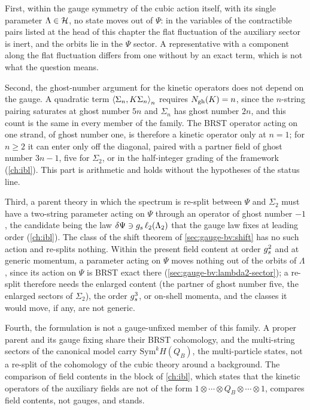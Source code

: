 First, within the gauge symmetry of the cubic action itself, with its single parameter $\Lambda \in \Hs$, no state moves out of $\Psi$: in the variables of the contractible pairs listed at the head of this chapter the flat fluctuation of the auxiliary sector is inert, and the orbits lie in the $\Psi$ sector.
A representative with a component along the flat fluctuation differs from one without by an exact term, which is not what the question means.

Second, the ghost-number argument for the kinetic operators does not depend on the gauge.
A quadratic term $\pair[n]{\Sigma_n}{K \Sigma_n}$ requires $\Ngh(K) = n$, since the $n$-string pairing saturates at ghost number $5 n$ and $\Sigma_n$ has ghost number $2 n$, and this count is the same in every member of the family.
The BRST operator acting on one strand, of ghost number one, is therefore a kinetic operator only at $n = 1$; for $n \ge 2$ it can enter only off the diagonal, paired with a partner field of ghost number $3 n - 1$, five for $\Sigma_2$, or in the half-integer grading of the \IBL{} framework (\cref{ch:ibl}).
This part is arithmetic and holds without the hypotheses of the status line.

Third, a parent theory in which the spectrum is re-split between $\Psi$ and $\Sigma_2$ must have a two-string parameter acting on $\Psi$ through an operator of ghost number $-1$, the candidate being the law $\delta \Psi \ni \gs \, \ell_2(\Lambda_2)$ that the \IBL{} gauge law fixes at leading order (\cref{ch:ibl}).
The class of the shift theorem of \cref{sec:gauge-bv:shift} has no such action and re-splits nothing.
Within the present field content at order $\gs^2$ and at generic momentum, a parameter acting on $\Psi$ moves nothing out of the orbits of $\Lambda$, since its action on $\Psi$ is BRST exact there (\cref{sec:gauge-bv:lambda2-sector}); a re-split therefore needs the enlarged content (the partner of ghost number five, the enlarged sectors of $\Sigma_2$), the order $\gs^3$, or on-shell momenta, and the classes it would move, if any, are not generic.

Fourth, the \IBL{} formulation is not a gauge-unfixed member of this family.
A proper parent and its gauge fixing share their BRST cohomology, and the multi-string sectors of the \IBL{} canonical model carry $\mathrm{Sym}^k H(Q_B)$, the multi-particle states, not a re-split of the cohomology of the cubic theory around a background.
The comparison of field contents in the \IBL{} block of \cref{ch:ibl}, which states that the kinetic operators of the auxiliary fields are not of the form $1 \otimes \cdots \otimes Q_B \otimes \cdots \otimes 1$, compares field contents, not gauges, and stands.

